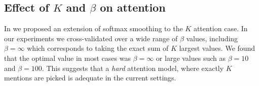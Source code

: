 \subsection{Effect of $K$ and $\beta$ on attention}



In  we proposed an extension of softmax smoothing to the $K$ attention case. In our experiments 
we cross-validated over a wide range of $\beta$ values, including $\beta=\infty$ which corresponds to taking
the exact sum of $K$ largest values. We found that the optimal value in most cases was  $\beta=\infty$ or large values
such as $\beta=10$ and $\beta=100$. This suggests that a {\em hard} attention model, where exactly $K$ mentions are picked is adequate in the current settings.



%
%



